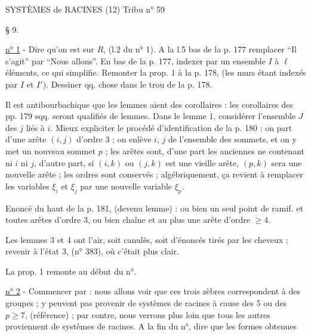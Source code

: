 SYSTÈMES de RACINES (12) \hfill Tribu n° 59

§ 9. 

\uline{n° 1} - Dire qu'on est sur $R$, (l.2 du n° 1). A la l.5 bas de la p. 177 remplacer ``Il s'agit'' par ``Nous allons''. En bas de la p. 177, indexer par un ensemble $I$ à $\ell$ éléments, ce qui simplifie. Remonter la prop. 1 à la p. 178, (les murs étant indexés par $I$ et $I'$). Dessiner qq. chose dans le trou de la p. 178.

Il est antibourbachique que les lemmes aient des corollaires : les corollaires des pp. 179 sqq. seront qualifiés de lemmes. Dans le lemme 1, considérer l'ensemble $J$ des $j$ liés à $i$. Mieux expliciter le procédé d'identification de la p. 180 : on part d'une arête $(i,j)$ d'ordre 3 ; on enlève $i$, $j$ de l'ensemble des sommets, et on y met un nouveau sommet $p$ ; les arêtes sont, d'une part les anciennes ne contenant ni $i$ ni $j$, d'autre part, si $(i,k)$ ou $(j,k)$ est une vieille arête, $(p,k)$ sera une nouvelle arête ; les ordres sont conservés ; algébriquement, ça revient à remplacer les variables $\xi_i$ et $\xi_j$ par une nouvelle variable $\xi_p$.

Enoncé du haut de la p. 181, (devenu lemme) : ou bien un seul point de ramif. et toutes arêtes d'ordre 3, ou bien chaîne et au plus une arête d'ordre $\geq4$.

Les lemmes 3 et 4 ont l'air, soit canulés, soit d'énoncés tirés par les cheveux ; revenir à l'état 3, (n° 383), où c'était plus clair.

La prop. 1 remonte au début du n°.

\uline{n° 2} - Commencer par : nous allons voir que ces trois zèbres correspondent à des groupes ; y peuvent pas provenir de systèmes de racines à cause des 5 ou des $p\geq7$, (référence) ; par contre, nous verrons plus loin que tous les autres proviennent de systèmes de racines. A la fin du n°, dire que les formes obtenues

